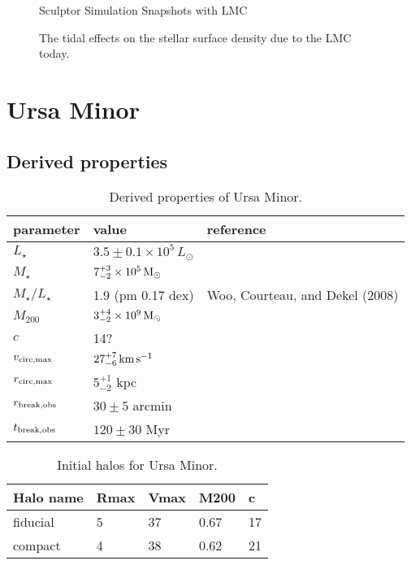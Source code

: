 \begin{figure}
\centering
{}
\caption{Sculptor Simulation Snapshots with LMC}
\end{figure}

\begin{figure}
\centering
{}
\caption[Sculptor initial and final density with LMC]{The tidal effects
on the stellar surface density due to the LMC today.}
\end{figure}

\section{Ursa Minor}\label{ursa-minor}

\subsection{Derived properties}\label{derived-properties}

\begin{table*}[t]
\centering
\caption[Derived Properties of Ursa Minor]{Derived properties of Ursa Minor. }
\label{tbl:umi_derived_props}
\begin{tabular}{lll}
\toprule
parameter & value & reference\\
\midrule
$L_\star$ & $3.5 \pm 0.1 \times 10^5\,L_\odot$ & \\
$M_\star$ & $7_{-2}^{+3} \times 10^5\,{\rm M}_{\odot}$ & \\
$M_\star / L_\star$ & 1.9 (pm 0.17 dex) & Woo, Courteau, and Dekel (2008)\\
$M_{200}$ & $3_{-2}^{+4} \times 10^9\,{\rm M}_{\odot}$ & \\
$c$ & 14? & \\
$v_{\rm circ, max}$ & $27_{-6}^{+7}\,{\rm km\,s^{-1}}$ & \\
$r_{\rm circ, max}$ & $5_{-2}^{+1}$ kpc & \\
$r_{\rm break, obs}$ & $30 \pm 5$ arcmin & \\
$t_{\rm break, obs}$ & $120\pm30$ Myr & \\
\bottomrule
\end{tabular}
\end{table*}

\begin{table*}[t]
\centering
\caption[Ursa Minor Initial Halos]{Initial halos for Ursa Minor. }
\label{tbl:umi_ini_halos}
\begin{tabular}{lllll}
\toprule
Halo name & Rmax & Vmax & M200 & c\\
\midrule
fiducial & 5 & 37 & 0.67 & 17\\
compact & 4 & 38 & 0.62 & 21\\
\bottomrule
\end{tabular}
\end{table*}

